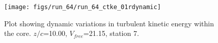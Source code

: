 \begin{figure}[H]
\centering
\texttt{[image: figs/run\_64/run\_64\_ctke\_01rdynamic]}
\caption{Plot showing dynamic variations in turbulent kinetic energy within the core. $z/c$=10.00, $V_{free}$=21.15, station 7.}
\label{fig:run_64_ctke_01rdynamic}
\end{figure}


